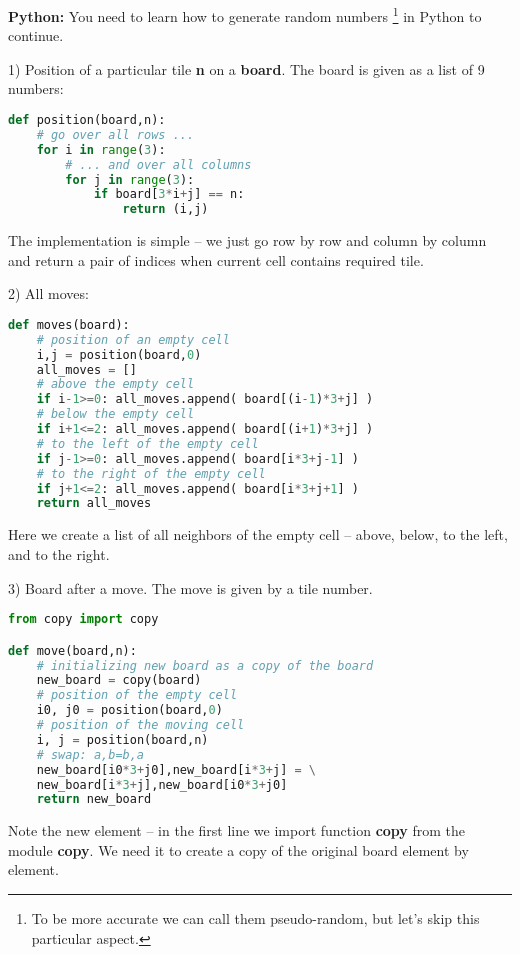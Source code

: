 \begin{tcolorbox}
\textbf{Python:}
You need to learn how to generate random numbers
\footnote{To be more accurate we can call them pseudo-random,
but let's skip this particular aspect.}
in Python to continue.
\end{tcolorbox}

1) Position of a particular tile \textbf{n} on a \textbf{board}. The
board is given as a list of 9 numbers:

\begin{lstlisting}[language=Python,style=codelst2,caption={Python: 8-puzzle, position of a tile}]
def position(board,n):
    # go over all rows ...
    for i in range(3):
        # ... and over all columns
        for j in range(3):
            if board[3*i+j] == n:
                return (i,j)
\end{lstlisting}
The implementation is simple -- we just go row by row and column by column 
and return a pair of indices when current cell contains required tile.

2) All moves:

\begin{lstlisting}[language=Python,style=codelst2,caption={Python: 8-puzzle, all moves}]
def moves(board):
    # position of an empty cell
    i,j = position(board,0)
    all_moves = []
    # above the empty cell
    if i-1>=0: all_moves.append( board[(i-1)*3+j] )
    # below the empty cell
    if i+1<=2: all_moves.append( board[(i+1)*3+j] )
    # to the left of the empty cell
    if j-1>=0: all_moves.append( board[i*3+j-1] )
    # to the right of the empty cell
    if j+1<=2: all_moves.append( board[i*3+j+1] )
    return all_moves
\end{lstlisting}
Here we create a list of all neighbors of the empty cell -- above,
below, to the left, and to the right.

3) Board after a move. The move is given by a tile number.

\begin{lstlisting}[language=Python,style=codelst2,caption={Python: 8-puzzle, making a move, returning new board}]
from copy import copy

def move(board,n):
    # initializing new board as a copy of the board
    new_board = copy(board)
    # position of the empty cell
    i0, j0 = position(board,0)
    # position of the moving cell
    i, j = position(board,n)
    # swap: a,b=b,a
    new_board[i0*3+j0],new_board[i*3+j] = \
    new_board[i*3+j],new_board[i0*3+j0]
    return new_board
\end{lstlisting}
Note the new element -- in the first line we import function 
\textbf{copy} from the module \textbf{copy}. We need it to
create a copy of the original board element by element.

